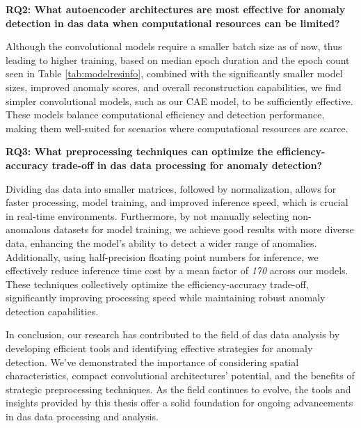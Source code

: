 \textbf{RQ2: What autoencoder architectures are most effective for anomaly detection in \acrshort{das} data when computational resources can be limited?}

Although the convolutional models require a smaller batch size as of now, thus leading to higher training, based on median epoch duration and the epoch count seen in Table \ref{tab:modelresinfo}, combined with the significantly smaller model sizes, improved anomaly scores, and overall reconstruction capabilities, we find simpler convolutional models, such as our CAE model, to be sufficiently effective. These models balance computational efficiency and detection performance, making them well-suited for scenarios where computational resources are scarce.

\textbf{RQ3: What preprocessing techniques can optimize the efficiency-accuracy trade-off in \acrshort{das} data processing for anomaly detection?}

Dividing \acrshort{das} data into smaller matrices, followed by normalization, allows for faster processing, model training, and improved inference speed, which is crucial in real-time environments. Furthermore, by not manually selecting non-anomalous datasets for model training, we achieve good results with more diverse data, enhancing the model's ability to detect a wider range of anomalies. Additionally, using half-precision floating point numbers for inference, we effectively reduce inference time cost by a mean factor of \textit{170} across our models. These techniques collectively optimize the efficiency-accuracy trade-off, significantly improving processing speed while maintaining robust anomaly detection capabilities.

In conclusion, our research has contributed to the field of \acrshort{das} data analysis by developing efficient tools and identifying effective strategies for anomaly detection. We've demonstrated the importance of considering spatial characteristics, compact convolutional architectures' potential, and the benefits of strategic preprocessing techniques. As the field continues to evolve, the tools and insights provided by this thesis offer a solid foundation for ongoing advancements in \acrshort{das} data processing and analysis.


